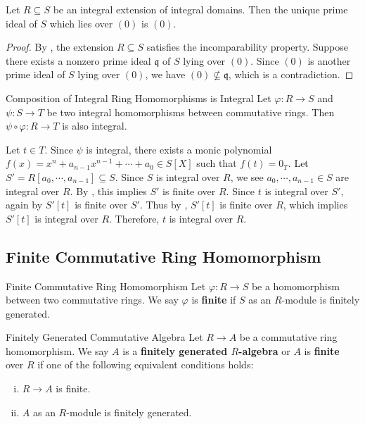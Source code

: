 \begin{corollary}{}{}
    Let $R\subseteq S$ be an integral extension of integral domains. Then the unique prime ideal of $S$ which lies over $(0)$ is $(0)$.
\end{corollary}
\begin{proof}
    By , the extension $R\subseteq S$ satisfies the incomparability property. Suppose there exists a nonzero prime ideal $\mathfrak{q}$ of $S$ lying over $(0)$. Since $(0)$ is another prime ideal of $S$ lying over $(0)$, we have $(0)\not\subseteq \mathfrak{q}$, which is a contradiction.
\end{proof}





\begin{proposition}{Composition of Integral Ring Homomorphisms is Integral}{}
    Let $\varphi:R\to S$ and $\psi:S\to T$ be two integral homomorphisms between commutative rings. Then $\psi\circ\varphi:R\to T$ is also integral.
\end{proposition}
\begin{prf}
    Let $t\in T$. Since $\psi$ is integral, there exists a monic polynomial $f(x)=x^n+a_{n-1}x^{n-1}+\cdots+a_0\in S[X]$ such that $f(t)=0_T$. Let $S'=R[a_0,\cdots,a_{n-1}]\subseteq S$. Since $S$ is integral over $R$, we see $a_0,\cdots,a_{n-1}\in S$ are integral over $R$. By , this implies $S'$ is finite over $R$. Since $t$ is integral over $S'$, again by  $S'[t]$ is finite over $S'$. Thus by , $S'[t]$ is finite over $R$, which implies $S'[t]$ is integral over $R$. Therefore, $t$ is integral over $R$.
\end{prf}


\subsection{Finite Commutative Ring Homomorphism}

\begin{definition}{Finite Commutative Ring Homomorphism}{}
    Let $\varphi:R\to S$ be a homomorphism between two commutative rings. We say $\varphi$ is \textbf{finite} if $S$ as an $R$-module is finitely generated.
\end{definition}

\begin{definition}{Finitely Generated Commutative Algebra}{}
    Let $R\to A$ be a commutative ring homomorphism. We say $A$ is a \textbf{finitely generated $R$-algebra} or $A$ is \textbf{finite} over $R$ if one of the following equivalent conditions holds:
    \begin{enumerate}[(i)]
        \item $R\to A$ is finite.
        \item $A$ as an $R$-module is finitely generated.
    \end{enumerate} 
\end{definition}

